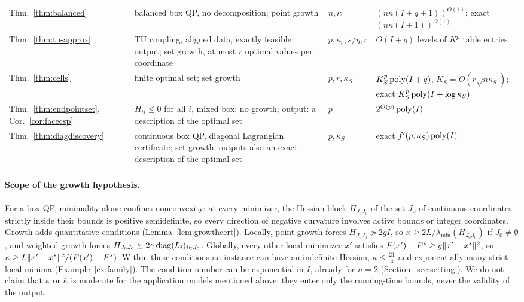 \begin{table}[tb]
\begin{tabular}{@{}>{\raggedright\arraybackslash}p{2.0cm}
>{\raggedright\arraybackslash}p{6.2cm}
>{\raggedright\arraybackslash}p{1.8cm}
>{\raggedright\arraybackslash}p{5.9cm}@{}}
Thm.~\ref{thm:balanced} & balanced box QP, no decomposition; point growth &
$n,\kappa$ & $(n\kappa(I+q+1))^{O(1)}$; exact $(n\kappa(I+1))^{O(1)}$\\
Thm.~\ref{thm:tu-approx} & TU coupling, aligned data, exactly feasible
output; set growth, at most $r$ optimal values per coordinate &
$p,\kappa_c,s/\eta,r$ & $O(I+q)$ levels of $K^p$ table entries\\
Thm.~\ref{thm:cells} & finite optimal set; set growth & $p,r,\kappa_S$ &
$K_S^p\operatorname{poly}(I+q)$, $K_S=O(r\sqrt{n\kappa_S})$; exact
$K_S^p\operatorname{poly}(I+\log\kappa_S)$\\
Thm.~\ref{thm:endpointset}, Cor.~\ref{cor:facecsp} & $H_{ii}\le0$ for all
$i$, mixed box; no growth; output: a description of the optimal set & $p$ &
$2^{O(p)}\operatorname{poly}(I)$\\
Thm.~\ref{thm:diagdiscovery} & continuous box QP, diagonal Lagrangian
certificate; set growth; outputs also an exact description of the optimal
set & $p,\kappa_S$ & exact
$f'(p,\kappa_S)\operatorname{poly}(I)$\\
\bottomrule
\end{tabular}
\end{table}

\paragraph{Scope of the growth hypothesis.}
For a box QP, minimality alone confines nonconvexity: at every minimizer, the
Hessian block $H_{J_0J_0}$ of the set $J_0$ of continuous coordinates
strictly inside their bounds is positive semidefinite, so every direction of
negative curvature involves active bounds or integer coordinates. Growth adds
quantitative conditions (Lemma~\ref{lem:growthcert}). Locally, point growth
forces $H_{J_0J_0}\succeq2gI$, so $\kappa\ge2L/\lambda_{\min}(H_{J_0J_0})$ if
$J_0\ne\emptyset$, and weighted growth forces
$H_{J_0J_0}\succeq2\gamma\operatorname{diag}(L_i)_{i\in J_0}$. Globally, every other local
minimizer $x'$ satisfies $F(x')-F^{*}\ge g\lVert x'-x^*\rVert^2$, so
$\kappa\ge L\lVert x'-x^*\rVert^2/(F(x')-F^{*})$. Within these conditions an
instance can have an indefinite Hessian, $\kappa\le\frac{21}4$ and
exponentially many strict local minima (Example~\ref{ex:family}). The
condition number can be exponential in $I$, already for $n=2$
(Section~\ref{sec:setting}). We do not claim that $\kappa$ or $\bar\kappa$
is moderate for the application models mentioned above; they enter only the
running-time bounds, never the validity of the output.

